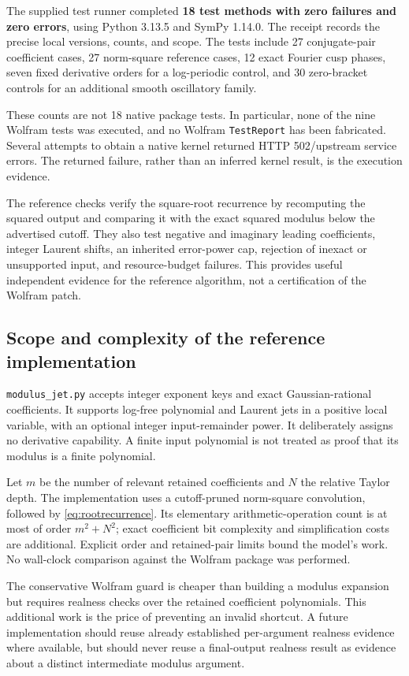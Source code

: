 \documentclass[11pt,a4paper]{article}
\newcommand{\code}[1]{\nolinkurl{#1}}
\begin{document}
The supplied test runner completed \textbf{18 test methods with zero failures and zero errors}, using Python 3.13.5 and SymPy 1.14.0. The receipt records the precise local versions, counts, and scope. The tests include 27 conjugate-pair coefficient cases, 27 norm-square reference cases, 12 exact Fourier cusp phases, seven fixed derivative orders for a log-periodic control, and 30 zero-bracket controls for an additional smooth oscillatory family.

These counts are not 18 native package tests. In particular, none of the nine Wolfram tests was executed, and no Wolfram \code{TestReport} has been fabricated. Several attempts to obtain a native kernel returned HTTP 502/upstream service errors. The returned failure, rather than an inferred kernel result, is the execution evidence.

The reference checks verify the square-root recurrence by recomputing the squared output and comparing it with the exact squared modulus below the advertised cutoff. They also test negative and imaginary leading coefficients, integer Laurent shifts, an inherited error-power cap, rejection of inexact or unsupported input, and resource-budget failures. This provides useful independent evidence for the reference algorithm, not a certification of the Wolfram patch.

\subsection{Scope and complexity of the reference implementation}

\code{modulus_jet.py} accepts integer exponent keys and exact Gaussian-rational coefficients. It supports log-free polynomial and Laurent jets in a positive local variable, with an optional integer input-remainder power. It deliberately assigns no derivative capability. A finite input polynomial is not treated as proof that its modulus is a finite polynomial.

Let $m$ be the number of relevant retained coefficients and $N$ the relative Taylor depth. The implementation uses a cutoff-pruned norm-square convolution, followed by \eqref{eq:rootrecurrence}. Its elementary arithmetic-operation count is at most of order $m^2+N^2$; exact coefficient bit complexity and simplification costs are additional. Explicit order and retained-pair limits bound the model's work. No wall-clock comparison against the Wolfram package was performed.

The conservative Wolfram guard is cheaper than building a modulus expansion but requires realness checks over the retained coefficient polynomials. This additional work is the price of preventing an invalid shortcut. A future implementation should reuse already established per-argument realness evidence where available, but should never reuse a final-output realness result as evidence about a distinct intermediate modulus argument.
\end{document}
